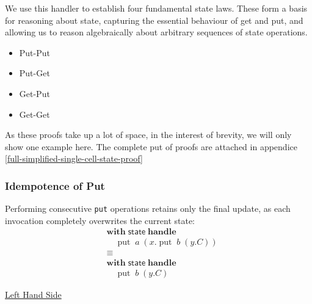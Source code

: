 \documentclass[logo,bsc,singlespacing,parskip]{infthesis}
\begin{document}
We use this handler to establish four fundamental state laws. These form a basis for reasoning about state, capturing the essential behaviour of get and put, and allowing us to reason algebraically about arbitrary sequences of state operations.

\begin{itemize}
    \item Put-Put 
    \item Put-Get
    \item Get-Put
    \item Get-Get
\end{itemize}

As these proofs take up a lot of space, in the interest of brevity, we will only show one example here. The complete put of proofs are attached in appendice \ref{full-simplified-single-cell-state-proof} 

\subsubsection*{Idempotence of Put}
Performing consecutive \lstinline{put} operations retains only the final update, as each invocation completely overwrites the current state:
\[
\begin{aligned}
    &\mathsf{\textbf{with}} \; \mathsf{state} \; \mathsf{\textbf{handle}} \\
    &\quad \operatorname{put} \; a \; (x. \operatorname{put} \; b \; (y. C)) \\
    &\equiv \\
    &\mathsf{\textbf{with}} \; \mathsf{state} \; \mathsf{\textbf{handle}} \\
    &\quad \operatorname{put} \; b \; (y. C)
\end{aligned}
\]

\underline{Left Hand Side}
\end{document}
